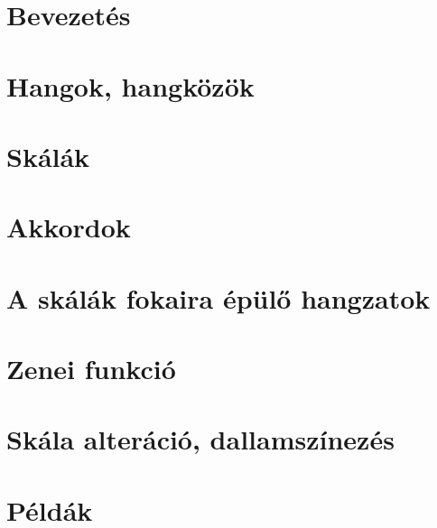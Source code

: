 
 
 





\tableofcontents

\clearpage

\section*{Bevezetés}
\label{sec:bevezetes}



\section{Hangok, hangközök}
\label{sec:hangokhangkozok}


\section{Skálák}
\label{sec:skalak}
 

\section{Akkordok}
\label{sec:akkordok}


\section{A skálák fokaira épülő hangzatok}
\label{sec:skalahangzat}


\section{Zenei funkció}
\label{sec:funkcio}


\section{Skála alteráció, dallamszínezés}
\label{sec:alteracio}


\section{Példák}
\label{sec:peldak}


\clearpage
{}
\label{sec:abrajegyzek}
\listoffigures

\clearpage
{}
\label{sec:tablajegyzek}
\listoftables

\clearpage
{}
\label{sec:targymutato}
\printindex

\clearpage
{}
\label{sec:melleklet}



